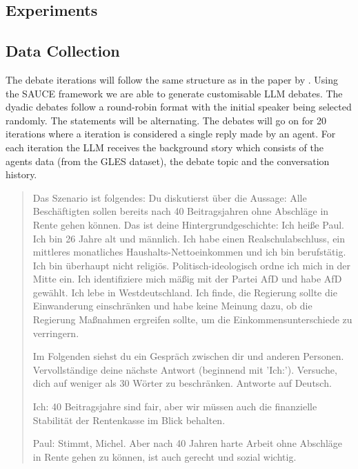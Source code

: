 \documentclass[12pt]{article}
\begin{document}
\begin{multicols}{2}



\section{Experiments}

\subsection{Data Collection}
\label{subsec:data_collection}

The debate iterations will follow the same structure as in the paper by . Using the SAUCE framework \cite{neuberger2024sauce} we are able to generate customisable LLM debates.  The dyadic debates follow a round-robin format with the initial speaker being selected randomly. The statements will be alternating. The debates will go on for 20 iterations where a iteration is considered a single reply made by an agent. For each iteration the LLM receives the background story which consists of the agents data (from the GLES dataset), the debate topic and the conversation history. 

\begin{quote}
Das Szenario ist folgendes: Du diskutierst über die Aussage: Alle Beschäftigten sollen bereits nach 40 Beitragsjahren ohne Abschläge in Rente gehen können.
Das ist deine Hintergrundgeschichte: Ich heiße Paul. Ich bin 26 Jahre alt und männlich. Ich habe einen Realschulabschluss, ein mittleres monatliches Haushalts-Nettoeinkommen und ich bin berufstätig. Ich bin überhaupt nicht religiös. Politisch-ideologisch ordne ich mich in der Mitte ein. Ich identifiziere mich mäßig mit der Partei AfD und habe AfD gewählt. Ich lebe in Westdeutschland. Ich finde, die Regierung sollte die Einwanderung einschränken und habe keine Meinung dazu, ob die Regierung Maßnahmen ergreifen sollte, um die Einkommensunterschiede zu verringern.

Im Folgenden siehst du ein Gespräch zwischen dir und anderen Personen. Vervollständige deine nächste Antwort (beginnend mit 'Ich:'). Versuche, dich auf weniger als 30 Wörter zu beschränken. Antworte auf Deutsch.

Ich: 40 Beitragsjahre sind fair, aber wir müssen auch die finanzielle Stabilität der Rentenkasse im Blick behalten.

Paul: Stimmt, Michel. Aber nach 40 Jahren harte Arbeit ohne Abschläge in Rente gehen zu können, ist auch gerecht und sozial wichtig.


\end{quote}
\end{multicols}
\end{document}
